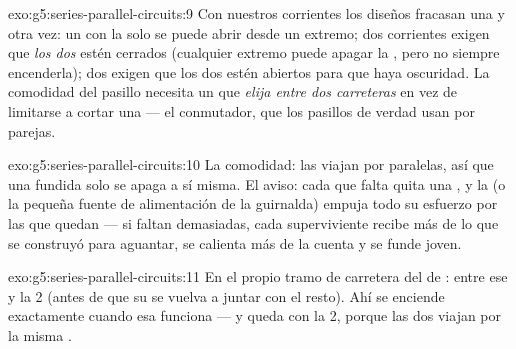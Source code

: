 \begin{solution}{exo:g5:series-parallel-circuits:9}
Con nuestros  corrientes los diseños fracasan una y otra
vez: un   con la  solo se puede
abrir desde un extremo; dos  corrientes 
exigen que \emph{los dos} estén cerrados (cualquier extremo puede
apagar la , pero no siempre encenderla); dos 
exigen que los dos estén abiertos para que haya oscuridad. La
comodidad del pasillo necesita un  que \emph{elija entre
dos carreteras} en vez de limitarse a cortar una --- el conmutador,
que los pasillos de verdad usan por parejas.
\end{solution}

\begin{solution}{exo:g5:series-parallel-circuits:10}
La comodidad: las  viajan por  paralelas, así que
una fundida solo se apaga a sí misma. El aviso: cada  que
falta quita una , y la  (o la pequeña fuente de
alimentación de la guirnalda) empuja todo su esfuerzo por las
 que quedan --- si faltan demasiadas, cada superviviente
recibe más de lo que se construyó para aguantar, se calienta más de la
cuenta y se funde joven.
\end{solution}

\begin{solution}{exo:g5:series-parallel-circuits:11}
En el propio tramo de carretera del  de : entre ese
 y la  2 (antes de que su  se vuelva
a juntar con el resto). Ahí se enciende exactamente cuando esa
 funciona --- y queda  con la  2, porque
las dos viajan por la misma .
\end{solution}
